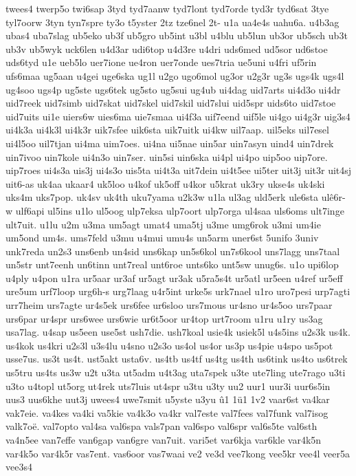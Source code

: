{twees4
twerp5o
twi6sap
3tyd
tyd7aanw
tyd7lont
tyd7orde
tyd3r
tyd6sat
3tye
tyl7oorw
3tyn
tyn7spre
ty3o
t5yster
2tz
tze6nel
2t-
u1a
ua4e4s
uahu6a.
u4b3ag
ubas4
uba7slag
ub5eko
ub3f
ub5gro
ub5int
u3bl
u4blu
ub5lun
ub3or
ub5sch
ub3t
ub3v
ub5wyk
uck6len
u4d3ar
udi6top
u4d3re
u4dri
uds6med
ud5sor
ud6stoe
uds6tyd
u1e
ueb5lo
uer7ione
ue4ron
uer7onde
ues7tria
ue5uni
u4fri
uf5rin
ufs6maa
ug5aan
u4gei
uge6ska
ug1l
u2go
ugo6mol
ug3or
u2g3r
ug3s
ugs4k
ugs4l
ug4soo
ugs4p
ug5ste
ugs6tek
ug5sto
ug5sui
ug4ub
ui4dag
uid7arts
ui4d3o
ui4dr
uid7reek
uid7simb
uid7skat
uid7skel
uid7skil
uid7slui
uid5spr
uids6to
uid7stoe
uid7uits
ui1e
uiers6w
uies6ma
uie7smaa
ui4f3a
uif7eend
uif5le
ui4go
ui4g3r
uig3s4
ui4k3a
ui4k3l
ui4k3r
uik7sfee
uik6sta
uik7uitk
ui4kw
uil7aap.
uil5eks
uil7esel
ui4l5oo
uil7tjan
ui4ma
uim7oes.
ui4na
ui5nae
uin5ar
uin7asyn
uind4
uin7drek
uin7ivoo
uin7kole
ui4n3o
uin7ser.
uin5si
uin6ska
ui4pl
ui4po
uip5oo
uip7ore.
uip7roes
ui4s3a
uis3j
ui4s3o
uis5ta
ui4t3a
uit7dein
ui4t5ee
ui5ter
uit3j
uit3r
uit4sj
uit6-as
uk4aa
ukaar4
uk5loo
u4kof
uk5off
u4kor
u5krat
uk3ry
ukse4s
uk4ski
uks4m
uks7pop.
uk4sv
uk4th
uku7yama
u2k3w
u1la
ul3ag
uld5erk
ule6sta
ulê6r-w
ulf6api
ul5ins
u1lo
ul5oog
ulp7eksa
ulp7oort
ulp7orga
ul4saa
uls6oms
ult7inge
ult7uit.
u1lu
u2m
u3ma
um5agt
umat4
uma5tj
u3me
umg6rok
u3mi
um4ie
um5ond
um4s.
ums7feld
u3mu
u4mui
umu4s
un5arm
uner6st
5unifo
3univ
unk7reda
un2s3
uns6enb
un4sid
uns6kap
un5s6kol
un7s6kool
uns7lagg
uns7taal
un5str
unt7eenh
un6tinn
unt7real
unt6roe
unts6ko
unt5sw
unug6s.
u1o
upi6lop
u4ply
u4pon
u1ra
ur5aar
ur3af
ur5agt
ur3ak
u5ra5s4t
ur5atl
ur5een
u4ref
ur5eff
ure5um
urf7loop
urg6h-s
urg7laag
u4r5int
urke5s
urk7nael
u1ro
uro7pesi
urp7agti
urr7heim
urs7agte
ur4s5ek
urs6fee
ur6sloo
urs7mous
ur4sno
ur4s5oo
urs7paar
urs6par
ur4spr
urs6wee
urs6wie
ur6t5oor
ur4top
urt7room
u1ru
u1ry
us3ag
usa7lag.
u4sap
us5een
use5st
ush7die.
ush7koal
usie4k
usiek5l
u4s5ins
u2s3k
us4k.
us4kok
us4kri
u2s3l
u3s4lu
u4sno
u2s3o
us4ol
us4or
us3p
us4pie
u4spo
us5pot
usse7us.
us3t
us4t.
ust5akt
usta6v.
us4tb
us4tf
us4tg
us4th
us6tink
us4to
us6trek
us5tru
us4ts
us3w
u2t
u3ta
ut5adm
u4t3ag
uta7spek
u3te
ute7ling
ute7rago
u3ti
u3to
u4topl
ut5org
ut4rek
uts7luis
ut4spr
u3tu
u3ty
uu2
uur1
uur3i
uur6s5in
uus3
uus6khe
uut3j
uwees4
uwe7smit
u5yste
u3yu
û1
1ü1
1v2
vaar6st
va4kar
vak7eie.
va4kes
va4ki
va5kie
va4k3o
va4kr
val7este
val7fees
val7funk
val7isog
valk7oë.
val7opto
val4sa
val6spa
vals7pan
val6spo
val6spr
val6s5te
val6sth
va4n5ee
van7effe
van6gap
van6gre
van7uit.
vari5et
var6kja
var6kle
var4k5n
var4k5o
var4k5r
vas7ent.
vas6oor
vas7waai
ve2
ve3d
vee7kong
vee5kr
vee4l
veer5a
vee3s4
}
